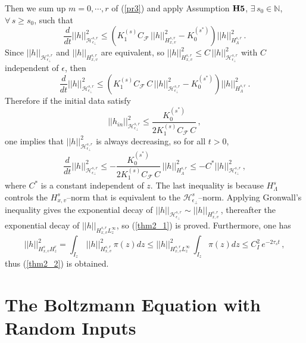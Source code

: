 \documentclass[final,onefignum,onetabnum]{siamart171218}
\begin{document}
Then we sum up $m=0, \cdots, r$ of (\ref{pr3}) and apply Assumption ${\bf H5}$, $\exists\, s_0\in\mathbb N$, $\forall\, s\geq s_0$, such that
\begin{equation}\label{h_perp}\frac{d}{dt}||h||_{\mathcal H_{\epsilon_{\perp}}^{s,r}}^2 \leq \left( K_1^{(s)} C_{\mathcal F}\, ||h||_{H_{x,v}^{s,r}}^2 - K_0^{(s^{\ast})}\right) ||h||_{H_{\Lambda}^{s,r}}^2\,.
\end{equation}
Since $||h||_{\mathcal H_{\epsilon_{\perp}}^{s,r}}$ and $||h||_{H_{x,v}^{s,r}}$ are equivalent, so
$||h||_{H_{x,v}^{s,r}}^2 \leq C\, ||h||_{\mathcal H_{\epsilon_{\perp}}^{s,r}}^2$ with $C$ independent of $\epsilon$, then
$$\frac{d}{dt} ||h||_{\mathcal H_{\epsilon_{\perp}}^{s,r}}^2\leq \left( K_1^{(s)}C_{\mathcal F}\, C\,  ||h||_{\mathcal H_{\epsilon_{\perp}}^{s,r}}^2 - K_0^{(s^{\ast})}\right) ||h||_{H_{\Lambda}^{s,r}}^2\,. $$
Therefore if the initial data satisfy
$$||h_{in}||_{\mathcal H_{\epsilon_{\perp}}^{s,r}}^2 \leq \frac{K_0^{(s^{\ast})}}{2K_1^{(s)}C_{\mathcal F}\, C}\,, $$
one implies that $||h||_{\mathcal H_{\epsilon_{\perp}}^{s,r}}^2$ is always decreasing, so for all $t>0$,
$$ \frac{d}{dt}||h||_{\mathcal H_{\epsilon_{\perp}}^{s,r}}^2 \leq - \frac{K_0^{(s^{\ast})}}{2K_1^{(s)}C_{\mathcal F}\, C}\, ||h||_{H_{\Lambda}^{s,r}}^2\leq
- C^{\ast} ||h||_{\mathcal H_{\epsilon_{\perp}}^{s,r}}^2\,,$$
where $C^{\ast}$ is a constant independent of $z$. The last inequality is because $H_{\Lambda}^s$ controls the $H_{x,v}^s$--norm that is equivalent to the
$\mathcal H_{\epsilon_{\perp}}^s$--norm. Applying Gronwall's inequality gives
the exponential decay of $||h||_{\mathcal H_{\epsilon_{\perp}}^{s,r}}\sim ||h||_{H_{x,v}^{s,r}}$\,, thereafter the exponential decay of
$||h||_{H_{x,v}^{s,r}L_z^{\infty}}$, so (\ref{thm2_1}) is proved.
Furthermore, one has \begin{equation}\label{Hz}||h||_{H_{x,v}^{s}H_z^r}^2 = \int_{I_z}\, ||h||_{H_{x,v}^{s,r}}^2\, \pi(z)dz \leq  ||h||_{H_{x,v}^{s,r}L_z^{\infty}}^2\, \int_{I_z} \pi(z)dz \leq
C_{I}^2\, e^{-2\tau_s t}\,, \end{equation}
thus (\ref{thm2_2}) is obtained.

\section{The Boltzmann Equation with Random Inputs}
\end{document}
